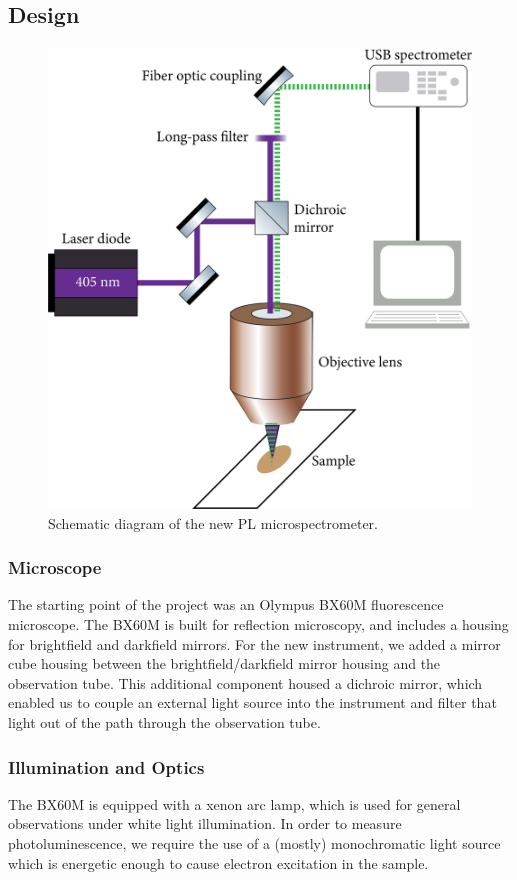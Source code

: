 \subsection{Design}

\begin{figure}[h]
    \centering
    \includegraphics[width=.75\textwidth]{img/optical-diagram.png}
    \caption{Schematic diagram of the new PL microspectrometer.}
    \label{img:optical-diagram}
\end{figure}

\subsubsection{Microscope}

The starting point of the project was an Olympus BX60M fluorescence microscope. The BX60M is built for reflection microscopy, and includes a housing for brightfield and darkfield mirrors. For the new instrument, we added a mirror cube housing between the brightfield/darkfield mirror housing and the observation tube. This additional component housed a dichroic mirror, which enabled us to couple an external light source into the instrument and filter that light out of the path through the observation tube.


\subsubsection{Illumination and Optics}
The BX60M is equipped with a xenon arc lamp, which is used for general observations under white light illumination. In order to measure photoluminescence, we require the use of a (mostly) monochromatic light source which is energetic enough to cause electron excitation in the sample. 

